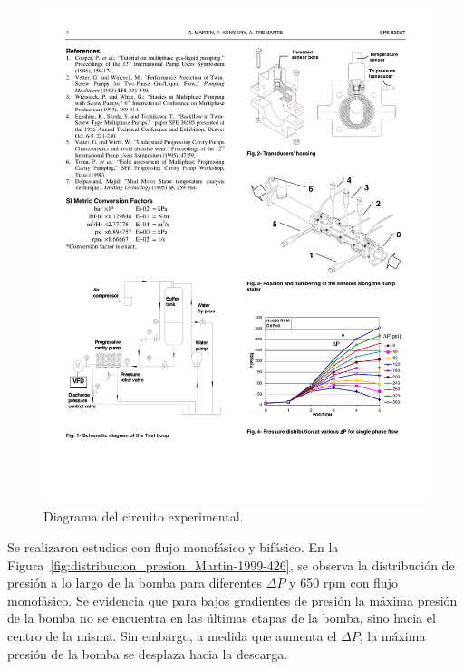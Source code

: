 \begin{figure}

\centering
		
\includegraphics[scale=1,draft=false]{diagrama_circuito_Martin-1999-426} 


\caption{Diagrama del circuito experimental.}

\label{fig:diagrama_circuito_Martin-1999-426}

\end{figure}

Se realizaron estudios con flujo monofásico y bifásico. En la Figura~\ref{fig:distribucion_presion_Martin-1999-426}, se observa la distribución de presión a lo largo de la bomba para diferentes $\Delta P$ y 650 rpm con flujo monofásico. Se evidencia que para bajos gradientes de presión la máxima presión de la bomba no se encuentra en las últimas etapas de la bomba, sino hacia el centro  de la misma. Sin embargo, a medida que aumenta el $\Delta P$, la máxima presión de la bomba se desplaza hacia la descarga.



